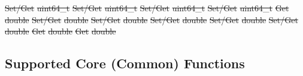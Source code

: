 \documentclass[12pt]{report} %
\providecommand{\DIFdeltex}[1]{{\protect\color{red}\sout{#1}}}                      %
\providecommand{\DIFdelend}{} %
\providecommand{\DIFdel}[1]{\texorpdfstring{\DIFdeltex{#1}}{}} %
\DeclareRobustCommand{\DIFdelend}{\DIFOaddend \let\includegraphics\DIFOincludegraphics} %
\begin{document}
\DIFdel{Set/Get }%
\DIFdel{uint64\_t }%
\DIFdel{Set/Get }%
\DIFdel{uint64\_t }%
\DIFdel{Set/Get }%
\DIFdel{uint64\_t }%
\DIFdel{Set/Get }%
\DIFdel{uint64\_t }%
\DIFdel{Get }%
\DIFdel{double }%
\DIFdel{Set/Get }%
\DIFdel{double }%
\DIFdel{Set/Get }%
\DIFdel{double }%
\DIFdel{Set/Get }%
\DIFdel{double }%
\DIFdel{Set/Get }%
\DIFdel{double }%
\DIFdel{Set/Get }%
\DIFdel{double }%
\DIFdel{Get }%
\DIFdel{double }%
\DIFdel{Get }%
\DIFdel{double }%

\DIFdelend \subsection{Supported Core (Common) Functions}\label{sec:RMOSSupportedCommon}
\end{document}
